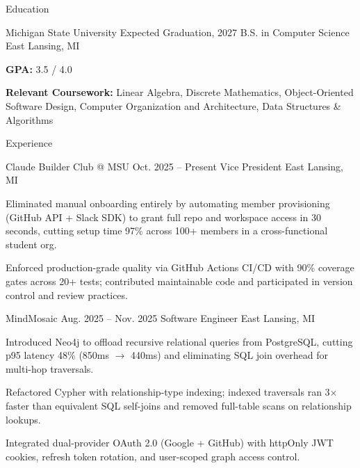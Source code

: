 \documentclass[
	11pt
]{../../../resume}
\begin{document}
	\begin{rSection}{E}{ducation}
		\begin{rSectionEntry}
			{Michigan State University}
			{Expected Graduation, 2027}
			{B.S. in Computer Science}
			{}
			{East Lansing, MI}

			\item \textbf{GPA:} 3.5 / 4.0
			\item \textbf{Relevant Coursework:} Linear Algebra, Discrete Mathematics, Object-Oriented Software Design, Computer Organization and Architecture, Data Structures \& Algorithms
		\end{rSectionEntry}
	\end{rSection}

	\begin{rSection}{E}{xperience}
		\begin{rSectionEntry}
			{Claude Builder Club @ MSU}
			{Oct. 2025 -- Present}
			{Vice President}
			{}
			{East Lansing, MI}

			\item Eliminated manual onboarding entirely by automating member provisioning (GitHub API + Slack SDK) to grant full repo and workspace access in 30 seconds, cutting setup time 97\% across 100+ members in a cross-functional student org.
			\item Enforced production-grade quality via GitHub Actions CI/CD with 90\% coverage gates across 20+ tests; contributed maintainable code and participated in version control and review practices.
		\end{rSectionEntry}

		\begin{rSectionEntry}
			{MindMosaic}
			{Aug. 2025 -- Nov. 2025}
			{Software Engineer}
			{}
			{East Lansing, MI}

			\item Introduced Neo4j to offload recursive relational queries from PostgreSQL, cutting p95 latency 48\% (850ms $\rightarrow$ 440ms) and eliminating SQL join overhead for multi-hop traversals.
			\item Refactored Cypher with relationship-type indexing; indexed traversals ran 3$\times$ faster than equivalent SQL self-joins and removed full-table scans on relationship lookups.
			\item Integrated dual-provider OAuth 2.0 (Google + GitHub) with httpOnly JWT cookies, refresh token rotation, and user-scoped graph access control.
		\end{rSectionEntry}
	\end{rSection}
\end{document}
